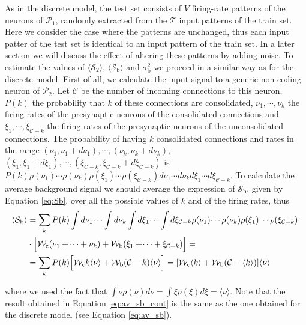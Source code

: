 \documentclass[a4paper, 12pt, twoside, openright]{book}
\newcommand{\popI}{\mathcal{P}_1}
\newcommand{\popII}{\mathcal{P}_2}
\newcommand{\T}{\mathcal{T}}
\newcommand{\C}{\mathcal{C}}
\newcommand{\Wb}{\mathcal{W}_\text{b}}
\newcommand{\Wc}{\mathcal{W}_\text{c}}
\newcommand{\SII}{\mathcal{S}_\text{2}}
\newcommand{\Sb}{\mathcal{S}_\text{b}}
\newcommand{\varSb}{\sigma^{2}_\text{b}}
\begin{document}
As in the discrete model, the test set consists of $V$ firing-rate patterns of the neurons of $\popI$, randomly extracted from the $\T$ input patterns of the train set.
Here we consider the case where the patterns are unchanged, thus each input patter of the test set is identical to an input pattern of the train set. In a later section we will discuss the effect of altering these patterns by adding noise.
To estimate the values of $\langle\SII\rangle$, $\langle\Sb\rangle$ and $\varSb$ we proceed in a similar way as for the discrete model.
First of all, we calculate the input signal to a generic non-coding neuron of $\popII$.
Let $\C$ be the number of incoming connections to this neuron,
$P(k)$ the probability that $k$ of these connections are consolidated, $\nu_1, \dotsi, \nu_k$ the firing rates of the
presynaptic neurons of the consolidated connections
and $\xi_1, \dotsi, \xi_{\C - k}$ the firing rates of the
presynaptic neurons of the unconsolidated connections.
The probability of having $k$ consolidated connections and rates in the range $(\nu_1, \nu_1+d\nu_1), \dotsi, (\nu_k, \nu_k + d\nu_k)$, $(\xi_1, \xi_1+d\xi_1), \dotsi, (\xi_{\C-k}, \xi_{\C-k} + d\xi_{\C-k})$ is $P(k)\rho (\nu_1)\dotsi \rho (\nu_k) \rho (\xi_1) \dotsi \rho (\xi_{\C-k})
d\nu_1 \dotsi d\nu_k d\xi_1 \dotsi d\xi_{\C-k}$.
To calculate the average background signal we should average the expression of $\Sb$, given by Equation \eqref{eq:Sb}, over all the possible values of $k$ and of the firing rates, thus 
\begin{equation}
\label{eq:av_sb_cont}
\begin{split}
    \langle \Sb \rangle &= \sum_{k} P(k) \int d\nu_1 \dotsi \int d\nu_k \int d\xi_1 \dotsi \int d\xi_{\C - k} \rho (\nu_1) \dotsi \rho (\nu_k) \rho (\xi_1) \dotsi \rho (\xi_{\C - k}) \cdot \\
    &\cdot\Bigl[ \Wc (\nu_1 + \dotsi + \nu_k) + \Wb (\xi_1 + \dotsi + \xi_{\C-k})\Bigr] = \\
    &= \sum_{k} P(k) \Bigl[ \Wc k \langle \nu \rangle + \Wb (\C-k) \langle \nu \rangle \Bigr]
    = [ \Wc \langle k \rangle 
    +  \Wb (\C - \langle k \rangle) ] \langle \nu \rangle
\end{split}
\end{equation}

where we used the fact that $\int \nu \rho(\nu) d\nu = \int \xi \rho(\xi) d\xi = \langle \nu \rangle$. Note that the result obtained in Equation \eqref{eq:av_sb_cont} is the same as the one obtained for the discrete model (see Equation \eqref{eq:av_sb}).
\end{document}
